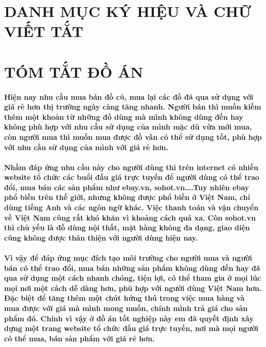 \documentclass{article}
\begin{document}
\tableofcontents %
\thispagestyle{empty}
\cleardoublepage

\section*{DANH MỤC KÝ HIỆU VÀ CHỮ VIẾT TẮT}
\cleardoublepage

\listoffigures %
\cleardoublepage

\listoftables %
\cleardoublepage

\section*{TÓM TẮT ĐỒ ÁN}
\paragraph{
Hiện nay nhu cầu mua bán đồ cũ, mua lại các đồ đã qua sử dụng với giá rẻ hơn thị trường ngày càng tăng nhanh. Người bán thì muốn kiếm thêm một khoản từ những đồ dùng mà mình không dùng đến hay không phù hợp với nhu cầu sử dụng của mình mặc dù vừa mới mua, còn người mua thì muốn mua được đồ vẫn có thể sử dụng tốt, phù hợp với nhu cầu sử dụng của mình với giá rẻ hơn.}
\paragraph{
Nhằm đáp ứng nhu cầu này cho người dùng thì trên internet có nhiều website tổ chức các buổi đấu giá trực tuyến để người dùng có thể trao đổi, mua bán các sản phẩm như ebay.vn, sohot.vn….Tuy nhiên ebay phổ biến trên thế giới, nhưng không được phổ biến ở Việt Nam, chỉ dùng tiếng Anh và các ngôn ngữ khác. Việc thanh toán và vận chuyển về Việt Nam cũng rất khó khăn vì khoảng cách quá xa. Còn sohot.vn thì chủ yếu là đồ dùng nội thất, mặt hàng không đa dạng, giao diện cũng không được thân thiện với người dùng hiện nay. }
\paragraph{
Vì vậy để đáp ứng mục đích tạo môi trường cho người mua và người bán có thể trao đổi, mua bán những sản phẩm không dùng đến hay đã qua sử dụng một cách nhanh chóng, tiện lợi, có thể tham gia ở mọi lúc mọi nơi một cách dễ dàng hơn, phù hợp với người dùng Việt Nam hơn. Đặc biệt để tăng thêm một chút hứng thú trong việc mua hàng và mua được với giá mà mình mong muốn, chính mình trả giá cho sản phẩm đó.  Chính vì vậy ở đồ án tốt nghiệp này em đã quyết định xây dựng một trang website tổ chức đấu giá trực tuyến, nơi mà mọi người có thể mua, bán sản phẩm với giá rẻ hơn.}
\end{document}
